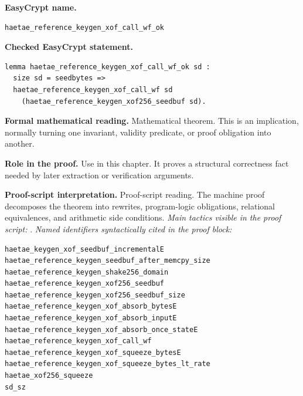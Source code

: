 \begin{formaltheorem}
\noindent\textbf{EasyCrypt name.}
\begin{lstlisting}[language=EasyCrypt,basicstyle=\ttfamily\scriptsize]
haetae_reference_keygen_xof_call_wf_ok
\end{lstlisting}
\noindent\textbf{Checked EasyCrypt statement.}
\begin{lstlisting}[language=EasyCrypt,basicstyle=\ttfamily\scriptsize]
lemma haetae_reference_keygen_xof_call_wf_ok sd :
  size sd = seedbytes =>
  haetae_reference_keygen_xof_call_wf sd
    (haetae_reference_keygen_xof256_seedbuf sd).
\end{lstlisting}
\noindent\textbf{Formal mathematical reading.}
Mathematical theorem. This is an implication, normally turning one invariant, validity predicate, or proof obligation into another.

\noindent\textbf{Role in the proof.}
Use in this chapter. It proves a structural correctness fact needed by later extraction or verification arguments.

\noindent\textbf{Proof-script interpretation.}
Proof-script reading. The machine proof decomposes the theorem into rewrites, program-logic obligations, relational equivalences, and arithmetic side conditions.
\emph{Main tactics visible in the proof script:} .
\emph{Named identifiers syntactically cited in the proof block:}
\begin{lstlisting}[language=EasyCrypt,basicstyle=\ttfamily\scriptsize]
haetae_keygen_xof_seedbuf_incrementalE
haetae_reference_keygen_seedbuf_after_memcpy_size
haetae_reference_keygen_shake256_domain
haetae_reference_keygen_xof256_seedbuf
haetae_reference_keygen_xof256_seedbuf_size
haetae_reference_keygen_xof_absorb_bytesE
haetae_reference_keygen_xof_absorb_inputE
haetae_reference_keygen_xof_absorb_once_stateE
haetae_reference_keygen_xof_call_wf
haetae_reference_keygen_xof_squeeze_bytesE
haetae_reference_keygen_xof_squeeze_bytes_lt_rate
haetae_xof256_squeeze
sd_sz
\end{lstlisting}

\end{formaltheorem}

